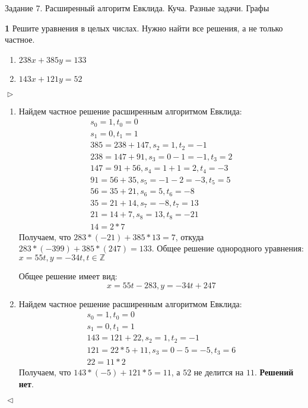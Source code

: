 \documentclass{article}
\begin{document}
\begin{center}
\Large {Задание 7. Расширенный алгоритм Евклида. Куча. Разные задачи. Графы}
\end{center}

\bigskip

\textbf{1} Решите уравнения в целых числах. Нужно найти все решения, а не только частное.

\begin{enumerate}
    \item $238x + 385y = 133$
    \item $143x + 121y = 52$
\end{enumerate}
$\vartriangleright$
\begin{enumerate}
  \item Найдем частное решение расширенным алгоритмом Евклида:
        \begin{gather*}
          s_{0} = 1, t_{0} = 0\\
          s_{1} = 0, t_{1} = 1\\
          385 = 238 + 147, s_{2} = 1, t_{2} = -1\\
          238 = 147 + 91, s_{3} = 0 - 1 = -1, t_{3} = 2\\
          147 = 91 + 56, s_{4} = 1 + 1 = 2, t_{4} = -3\\
          91 = 56 + 35, s_{5} = -1-2 = -3, t_{5} = 5\\
          56 = 35 + 21, s_{6} = 5, t_{6} = -8\\
          35 = 21 + 14, s_{7} = -8, t_{7} = 13\\
          21 = 14 + 7, s_{8} = 13, t_{8} = -21\\
          14 = 2*7
        \end{gather*}
        Получаем, что $283*(-21) + 385*13 = 7$, откуда $283*(-399) + 385*(247) = 133$.
        Общее решение однородного уравнения:$x = 55t, y = -34t, t \in \mathbb{Z}$

        Общее решение имеет вид: \[x = 55t - 283, y = -34t + 247\]
  \item Найдем частное решение расширенным алгоритмом Евклида:
        \begin{gather*}
          s_{0} = 1, t_{0} = 0\\
          s_{1} = 0, t_{1} = 1\\
          143 = 121 + 22, s_{2} = 1, t_{2} = -1\\
          121 = 22*5 + 11 , s_{3} = 0 - 5 = -5, t_{3} = 6\\
          22 = 11*2
        \end{gather*}
        Получаем, что $143*(-5) + 121*5 = 11$, а $52$ не делится на $11$. \textbf{Решений нет}.

\end{enumerate}
                            $\vartriangleleft$
\medskip
\end{document}
